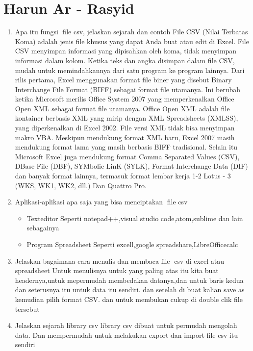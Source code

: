 ﻿\section{Harun Ar - Rasyid}
\begin{enumerate}
    \item Apa itu fungsi file csv, jelaskan sejarah dan contoh
    File CSV (Nilai Terbatas Koma) adalah jenis file khusus yang dapat Anda buat atau edit di Excel. File CSV menyimpan informasi yang dipisahkan oleh koma, tidak menyimpan informasi dalam kolom. Ketika teks dan angka disimpan dalam file CSV, mudah untuk memindahkannya dari satu program ke program lainnya.
    Dari rilis pertama, Excel menggunakan format file biner yang disebut Binary Interchange File Format (BIFF) sebagai format file utamanya. Ini berubah ketika Microsoft merilis Office System 2007 yang memperkenalkan Office Open XML sebagai format file utamanya. Office Open XML adalah file kontainer berbasis XML yang mirip dengan XML Spreadsheets (XMLSS), yang diperkenalkan di Excel 2002. File versi XML tidak bisa menyimpan makro VBA.
    Meskipun mendukung format XML baru, Excel 2007 masih mendukung format lama yang masih berbasis BIFF tradisional. Selain itu Microsoft Excel juga mendukung format Comma Separated Values (CSV), DBase File (DBF), SYMbolic LinK (SYLK), Format Interchange Data (DIF) dan banyak format lainnya, termasuk format lembar kerja 1-2 Lotus - 3 (WKS, WK1, WK2, dll.) Dan Quattro Pro.
    \item Aplikasi-aplikasi apa saja yang bisa menciptakan file csv
    \begin{itemize}
        \item Texteditor
        Seperti notepad++,visual studio code,atom,sublime dan lain sebagainya
        \item Program Spreadsheet
        Seperti excell,google spreadshare,LibreOfficecalc
    \end{itemize}
    \item Jelaskan bagaimana cara menulis dan membaca file csv di excel atau spreadsheet
    Untuk menulisnya untuk yang paling atas itu kita buat headernya,untuk mepermudah membedakan datanya,dan untuk baris kedua dan seterusnya itu untuk data itu sendiri.
    dan setelah di buat kalian save as kemudian pilih format CSV.
    dan untuk membukan cukup di double clik file tersebut
    \item Jelaskan sejarah library csv
    library csv dibuat untuk permudah mengolah data. Dan mempermudah untuk melakukan export dan import file csv itu sendiri

\end{enumerate}
